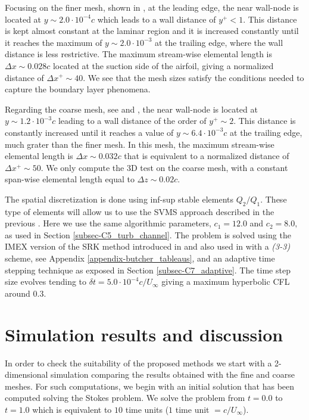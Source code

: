 Focusing on the finer mesh, shown in , at the leading edge, the near wall-node is located at $y\sim 2.0\cdot10^{-4}c$ which leads to a wall distance of $ y^+<1$. This distance is kept almost constant at the laminar region and it is increased constantly until it reaches the maximum of $y\sim2.0\cdot10^{-3}$ at the trailing edge, where the wall distance is less restrictive. The maximum stream-wise elemental length is $\Delta x\sim0.028c$ located at the suction side of the airfoil, giving a normalized distance of $\Delta x^+\sim40$. We see that the mesh sizes satisfy the conditions needed to capture the boundary layer phenomena.

Regarding the coarse mesh, see  and , the near wall-node is located at $y\sim 1.2\cdot10^{-3}c$ leading to a wall distance of the order of $ y^+\sim 2 $. This distance is constantly increased until it reaches a value of $y\sim6.4\cdot10^{-3}c$ at the trailing edge, much grater than the finer mesh. In this mesh, the maximum stream-wise elemental length is $\Delta x\sim0.032c$ that is equivalent to a normalized distance of $\Delta x^+\sim50$. We only compute the 3D test on the coarse mesh, with a constant span-wise elemental length equal to $ \Delta z\sim0.02c $.

The spatial discretization is done using inf-sup stable elements $Q_2/Q_1$. These type of elements will allow us to use the SVMS approach described in the previous . Here we use the same algorithmic parameters, $ c_1=12.0 $ and $ c_2=8.0, $ as used in Section \ref{subsec-C5_turb_channel}. The problem is solved using the IMEX version of the SRK method introduced in  and also used in  with a \textit{(3-3)} scheme, see Appendix \ref{appendix-butcher_tableaus}, and an adaptive time stepping technique as exposed in Section \ref{subsec-C7_adaptive}. The time step size evolves tending to $ \delta t= 5.0\cdot10^{-4}c/U_\infty$ giving a maximum hyperbolic CFL around $ 0.3 $.

\section{Simulation results and discussion}
\label{sec-C8_results}
In order to check the suitability of the proposed methods we start with a 2-dimensional simulation comparing the results obtained with the fine and coarse meshes. For such computations, we begin with an initial solution that has been computed solving the Stokes problem. We solve the problem from $ t=0.0 $ to $ t=1.0 $ which is equivalent to $ 10 $ time units ($1$ time unit $=c/U_\infty$).

